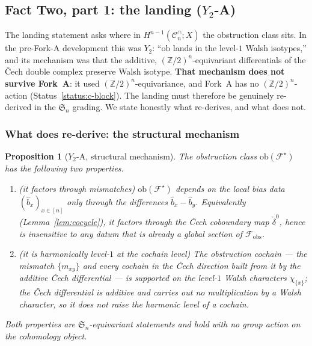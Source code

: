 \documentclass[11pt,oneside]{amsart}
\theoremstyle{plain}
\newtheorem{proposition}[theorem]{Proposition}
\theoremstyle{definition}
\theoremstyle{remark}
\theoremstyle{honeststyle}
\newcommand{\F}{\mathcal{F}}
\newcommand{\Fstar}{\F^{\star}}
\newcommand{\Sym}{\mathfrak{S}}
\newcommand{\Z}{\mathbb{Z}}
\newcommand{\Cn}{\mathcal{C}^{\cap}_n}
\newcommand{\ob}{\mathrm{ob}}
\newcommand{\fobs}{\mathcal{F}_{\mathrm{obs}}}
\newcommand{\walsh}[1]{\chi_{#1}}
\begin{document}
\subsection{Fact Two, part 1: the landing ($Y_2$-A)}
\label{ssec:y2a}

The landing statement asks where in $H^{n-1}(\Cn;X)$ the obstruction
class sits. In the pre-Fork-A development this was $Y_2$: ``$\ob$
lands in the level-$1$ Walsh isotypes,'' and its mechanism was that
the additive, $(\Z/2)^n$-equivariant differentials of the \v{C}ech
double complex preserve Walsh isotype. \textbf{That mechanism does not
survive Fork~A}: it used $(\Z/2)^n$-equivariance, and Fork~A has no
$(\Z/2)^n$-action (Status~\ref{status:c-block}). The landing must
therefore be genuinely re-derived in the $\Sym_n$ grading. We state
honestly what re-derives, and what does not.

\subsubsection*{What does re-derive: the structural mechanism}

\begin{proposition}[$Y_2$-A, structural mechanism]
\label{prop:y2a-mech}
The obstruction class $\ob(\Fstar)$ has the following two properties.
\begin{enumerate}[label=\textup{(\arabic*)},leftmargin=2.4em]
\item \textup{(it factors through mismatches)} $\ob(\Fstar)$ depends on
  the local bias data $(\widehat b_x)_{x\in[n]}$ \emph{only through the
  differences} $\widehat b_x-\widehat b_y$. Equivalently
  (Lemma~\ref{lem:cocycle}), it factors through the \v{C}ech coboundary
  map $\check\delta^{0}$, hence is insensitive to any datum that is
  already a global section of $\fobs$.
\item \textup{(it is harmonically level-$1$ at the cochain level)} The
  obstruction \emph{cochain} --- the mismatch $\{m_{xy}\}$ and every
  cochain in the \v{C}ech direction built from it by the additive
  \v{C}ech differential --- is supported on the level-$1$ Walsh
  characters $\walsh{\{x\}}$; the \v{C}ech differential is additive
  and carries out no multiplication by a Walsh character, so it does
  not raise the harmonic level of a cochain.
\end{enumerate}
Both properties are $\Sym_n$-equivariant statements and hold with no
group action on the cohomology object.
\end{proposition}
\end{document}
